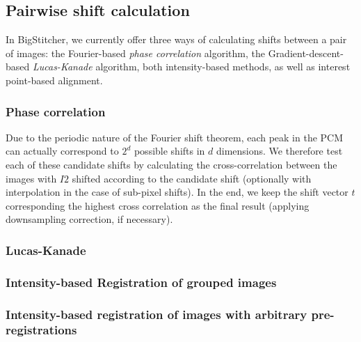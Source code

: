 \subsection{Pairwise shift calculation}

In BigStitcher, we currently offer three ways of calculating shifts between a pair of images: the Fourier-based \emph{phase correlation} algorithm, the Gradient-descent-based \emph{Lucas-Kanade} algorithm, both intensity-based methods, as well as interest point-based alignment.

\subsubsection{Phase correlation}

Due to the periodic nature of the Fourier shift theorem, each peak in the PCM can actually correspond to $2^d$ possible shifts in $d$ dimensions. We therefore test each of these candidate shifts by calculating the cross-correlation between the images with $I2$ shifted according to the candidate shift (optionally with interpolation in the case of sub-pixel shifts). In the end, we keep the shift vector $t$ corresponding the highest cross correlation as the final result (applying downsampling correction, if necessary).

\subsubsection{Lucas-Kanade}

\subsubsection{Intensity-based Registration of grouped images}

\subsubsection{Intensity-based registration of images with arbitrary pre-registrations}

